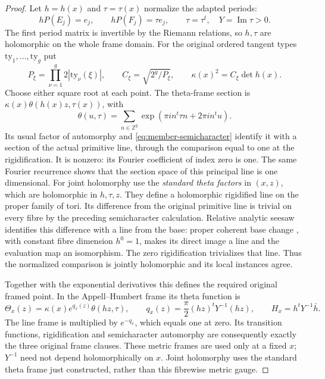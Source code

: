\begin{proof}
Let $h=h(x)$ and $\tau=\tau(x)$ normalize the adapted periods:
\[
       hP(E_j)=e_j,\qquad hP(F_j)=\tau e_j,\qquad
       \tau=\tau^t,\quad Y=\operatorname{Im}\tau>0.
\]
The first period matrix is invertible by the Riemann relations,
so $h,\tau$ are holomorphic on the whole frame domain.
For the original ordered tangent types $\mathrm{ty}_1,\ldots,
\mathrm{ty}_g$ put
\begin{equation}\label{eq:member-kappa}
 P_\xi=\prod_{\nu=1}^g2|\mathrm{ty}_\nu(\xi)|,\qquad
 C_\xi=\sqrt{2^g/P_\xi},\qquad
                       \kappa(x)^2=C_\xi\det h(x).
\end{equation}
Choose either square root at each point.  The theta-frame
section is $\kappa(x)\theta(h(x)z,\tau(x))$, with
\[
       \theta(u,\tau)=\sum_{n\in\mathbb Z^g}
                         \exp(\pi i n^t\tau n+2\pi i n^tu).
\]
Its usual factor of automorphy and
\eqref{eq:member-semicharacter} identify it with a section of
the actual primitive line, through the comparison equal to one
at the rigidification.  It is nonzero: its Fourier coefficient
of index zero is one.  The same Fourier recurrence shows that
the section space of this principal line is one dimensional.
For joint holomorphy use the \emph{standard theta factors}
in $(x,z)$, which are holomorphic in $h,\tau,z$.
They define a holomorphic rigidified line on the proper
family of tori.  Its difference from the original primitive
line is trivial on every fibre by the preceding semicharacter
calculation.  Relative analytic seesaw identifies this difference
with a line from the base: proper coherent base change
\cite[\S7, Satz~5]{member-grauert}, with
constant fibre dimension $h^0=1$, makes its direct image a
line and the evaluation map an isomorphism.  The zero
rigidification trivializes that line.  Thus the normalized
comparison is jointly holomorphic and its local instances agree.

Together with the exponential derivatives this defines the
required original framed point.  In the Appell--Humbert frame
its theta function is
\[
 \Theta_x(z)=\kappa(x)e^{q_x(z)}\theta(hz,\tau),\qquad
 q_x(z)=\frac{\pi}{2}(hz)^tY^{-1}(hz),\qquad
 H_x=h^tY^{-1}\bar h.
\]
The line frame is multiplied by $e^{-q_x}$, which equals one
at zero.  Its transition functions, rigidification and
semicharacter automorphy are consequently exactly the
three original frame clauses.  These metric frames are used
only at a fixed $x$; $Y^{-1}$ need not depend holomorphically
on $x$.  Joint holomorphy uses the standard theta frame just
constructed, rather than this fibrewise metric gauge.


\end{proof}
